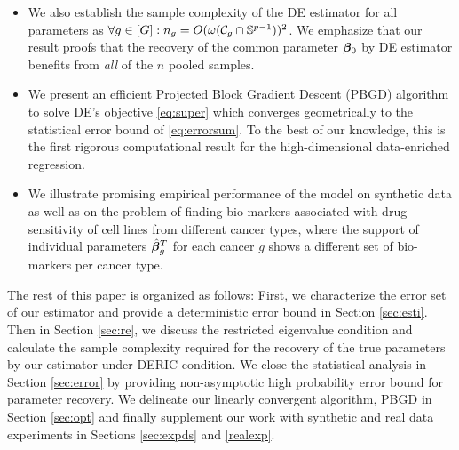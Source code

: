\begin{itemize}[leftmargin = .4cm]
	\item We also establish the sample complexity of the DE estimator for all parameters as $\forall g \in [G]: n_g = O(\omega({\cal C}_g \cap \mathbb S^{p-1}))^2$. We emphasize that our result proofs that the recovery of the common parameter $\boldsymbol{\beta}_0$ by DE estimator benefits from \emph{all} of the $n$ pooled samples.
	\item We present an efficient Projected Block Gradient Descent (PBGD) algorithm to solve DE's objective \eqref{eq:super} which converges geometrically to the statistical error bound of \eqref{eq:errorsum}. To the best of our knowledge, this is the first rigorous computational result for the high-dimensional data-enriched regression.
	\item We illustrate promising empirical performance of the model on synthetic data as well as on the problem of finding bio-markers associated with drug sensitivity of cell lines from different cancer types, where the support of individual parameters $\hat{\boldsymbol{\beta}}_g^T$ for each cancer $g$ shows a different set of bio-markers per cancer type.
\end{itemize}

The rest of this paper is organized as follows:
First, we characterize the error set of our estimator and provide a deterministic error bound in Section \ref{sec:esti}.
Then in Section \ref{sec:re}, we discuss the restricted eigenvalue condition and calculate the sample complexity required for the recovery of the true parameters by our estimator under DERIC condition.
We close the statistical analysis in Section \ref{sec:error} by providing non-asymptotic high probability error bound for parameter recovery.
We delineate our linearly convergent algorithm, PBGD in Section \ref{sec:opt} and finally supplement our work with synthetic and real data experiments in Sections \ref{sec:expds} and \ref{realexp}.

